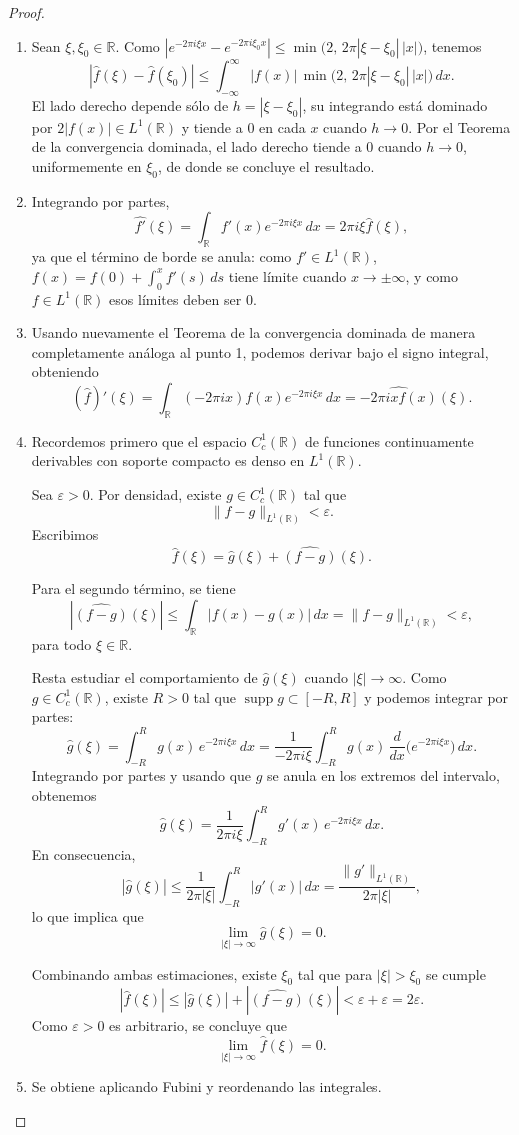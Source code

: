 \documentclass[12pt, a4paper]{amsbook}
\newcommand{\ve}{\varepsilon}
\newcommand{\R}{{\mathbb R}}
\theoremstyle{remark}
\theoremstyle{definition}
\numberwithin{section}{chapter}
\numberwithin{subsection}{section}
\numberwithin{equation}{section}
\numberwithin{figure}{chapter}
\begin{document}
\begin{proof}
\begin{enumerate}
\item Sean $\xi,\xi_0\in\R$. Como $|e^{-2\pi i\xi x}-e^{-2\pi i\xi_0 x}|\le \min\bigl(2,\, 2\pi|\xi-\xi_0|\,|x|\bigr)$, tenemos
$$
|\hat f(\xi)-\hat f(\xi_0)| \le \int_{-\infty}^\infty |f(x)|\,\min\bigl(2,\, 2\pi|\xi-\xi_0|\,|x|\bigr)\, dx.
$$
El lado derecho depende sólo de $h=|\xi-\xi_0|$, su integrando está dominado por $2|f(x)|\in L^1(\R)$ y tiende a $0$ en cada $x$ cuando $h\to0$. Por el Teorema de la convergencia dominada, el lado derecho tiende a $0$ cuando $h\to 0$, uniformemente en $\xi_0$, de donde se concluye el resultado.

\item Integrando por partes,
$$
\widehat{f'}(\xi)=\int_{\R} f'(x)e^{-2\pi i \xi x}\,dx =2\pi i \xi\hat f(\xi),
$$
ya que el término de borde se anula: como $f'\in L^1(\R)$, $f(x)=f(0)+\int_0^x f'(s)\,ds$ tiene límite cuando $x\to\pm\infty$, y como $f\in L^1(\R)$ esos límites deben ser $0$.

\item Usando nuevamente el Teorema de la convergencia dominada de manera completamente análoga al punto 1, podemos derivar bajo el signo integral, obteniendo
$$
(\hat f)'(\xi)=\int_{\R} (-2\pi i x)f(x)e^{-2\pi i \xi x}\,dx = \widehat{-2\pi i x f(x)}(\xi).
$$

\item Recordemos primero que el espacio $C_c^1(\R)$ de funciones continuamente derivables con soporte compacto es denso en $L^1(\R)$.

Sea $\ve>0$. Por densidad, existe $g\in C_c^1(\R)$ tal que
\[
\|f-g\|_{L^1(\R)}<\ve.
\]
Escribimos
\[
\hat f(\xi)=\hat g(\xi)+\widehat{(f-g)}(\xi).
\]

Para el segundo término, se tiene
\[
|\widehat{(f-g)}(\xi)|
\le
\int_{\R} |f(x)-g(x)|\,dx
=
\|f-g\|_{L^1(\R)}
<
\ve,
\]
para todo $\xi\in\R$.

Resta estudiar el comportamiento de $\hat g(\xi)$ cuando $|\xi|\to\infty$.
Como $g\in C_c^1(\R)$, existe $R>0$ tal que $\operatorname{supp} g\subset[-R,R]$ y podemos integrar por partes:
\[
\hat g(\xi)
=
\int_{-R}^R g(x)\,e^{-2\pi i\xi x}\,dx
=
\frac{1}{-2\pi i\xi}\int_{-R}^R g(x)\,\frac{d}{dx}\bigl(e^{-2\pi i\xi x}\bigr)\,dx.
\]
Integrando por partes y usando que $g$ se anula en los extremos del intervalo, obtenemos
\[
\hat g(\xi)
=
\frac{1}{2\pi i\xi}\int_{-R}^R g'(x)\,e^{-2\pi i\xi x}\,dx.
\]
En consecuencia,
\[
|\hat g(\xi)|
\le
\frac{1}{2\pi |\xi|}\int_{-R}^R |g'(x)|\,dx
=
\frac{\|g'\|_{L^1(\R)}}{2\pi |\xi|},
\]
lo que implica que
\[
\lim_{|\xi|\to\infty} \hat g(\xi)=0.
\]

Combinando ambas estimaciones, existe $\xi_0$ tal que para $|\xi|>\xi_0$ se cumple
\[
|\hat f(\xi)|
\le
|\hat g(\xi)| + |\widehat{(f-g)}(\xi)|
<
\ve + \ve
=
2\ve.
\]
Como $\ve>0$ es arbitrario, se concluye que
\[
\lim_{|\xi|\to\infty} \hat f(\xi)=0.
\]

\item Se obtiene aplicando Fubini y reordenando las integrales.
\end{enumerate}
\end{proof}
\end{document}
